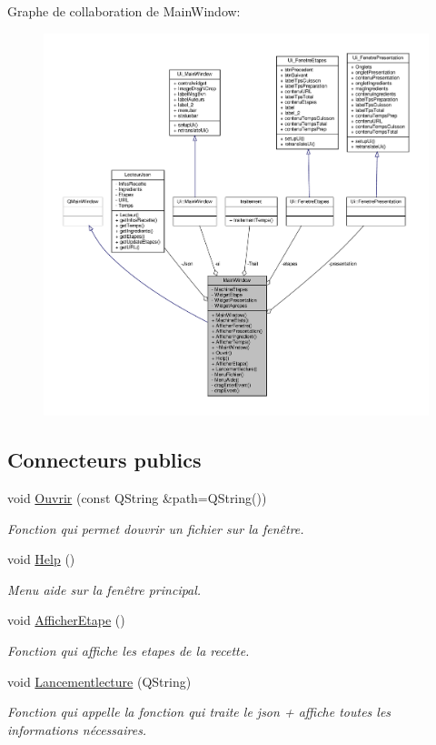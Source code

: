 Graphe de collaboration de Main\+Window\+:
\nopagebreak
\begin{figure}[H]
\begin{center}
\leavevmode
\includegraphics[width=350pt]{class_main_window__coll__graph}
\end{center}
\end{figure}
\subsection*{Connecteurs publics}
\begin{DoxyCompactItemize}
\item 
void \hyperlink{class_main_window_a37a30280ba05a52445ecbea9deaa5385}{Ouvrir} (const Q\+String \&path=Q\+String())
\begin{DoxyCompactList}\small\item\em Fonction qui permet d\textquotesingle{}ouvrir un fichier sur la fenêtre. \end{DoxyCompactList}\item 
void \hyperlink{class_main_window_a25ec89113c14218717cfade9a58f8fdb}{Help} ()
\begin{DoxyCompactList}\small\item\em Menu aide sur la fenêtre principal. \end{DoxyCompactList}\item 
void \hyperlink{class_main_window_ae90cd3ee3e8e0b2ddf842514fafd13dc}{Afficher\+Etape} ()
\begin{DoxyCompactList}\small\item\em Fonction qui affiche les etapes de la recette. \end{DoxyCompactList}\item 
void \hyperlink{class_main_window_ac368dfd7e2609f0cb72fc1428771aa97}{Lancementlecture} (Q\+String)
\begin{DoxyCompactList}\small\item\em Fonction qui appelle la fonction qui traite le json + affiche toutes les informations nécessaires. \end{DoxyCompactList}\end{DoxyCompactItemize}
